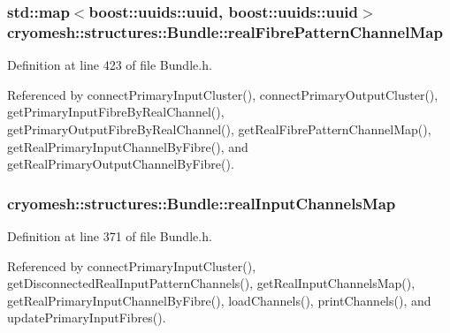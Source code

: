 \hypertarget{classcryomesh_1_1structures_1_1Bundle_adaf7fa91209de01b9d42ae2d8228c3cd}{
\subsubsection[{real\-Fibre\-Pattern\-Channel\-Map}]{\setlength{\rightskip}{0pt plus 5cm}std\-::map$<$boost\-::uuids\-::uuid, boost\-::uuids\-::uuid$>$ {\bf cryomesh\-::structures\-::\-Bundle\-::real\-Fibre\-Pattern\-Channel\-Map}}}\label{classcryomesh_1_1structures_1_1Bundle_adaf7fa91209de01b9d42ae2d8228c3cd}


\-Definition at line 423 of file \-Bundle.\-h.



\-Referenced by connect\-Primary\-Input\-Cluster(), connect\-Primary\-Output\-Cluster(), get\-Primary\-Input\-Fibre\-By\-Real\-Channel(), get\-Primary\-Output\-Fibre\-By\-Real\-Channel(), get\-Real\-Fibre\-Pattern\-Channel\-Map(), get\-Real\-Primary\-Input\-Channel\-By\-Fibre(), and get\-Real\-Primary\-Output\-Channel\-By\-Fibre().

\hypertarget{classcryomesh_1_1structures_1_1Bundle_ac9bd1c696001ef8acb7291a5f9e81c8b}{
\subsubsection[{real\-Input\-Channels\-Map}]{ {\bf cryomesh\-::structures\-::\-Bundle\-::real\-Input\-Channels\-Map}}}\label{classcryomesh_1_1structures_1_1Bundle_ac9bd1c696001ef8acb7291a5f9e81c8b}


\-Definition at line 371 of file \-Bundle.\-h.



\-Referenced by connect\-Primary\-Input\-Cluster(), get\-Disconnected\-Real\-Input\-Pattern\-Channels(), get\-Real\-Input\-Channels\-Map(), get\-Real\-Primary\-Input\-Channel\-By\-Fibre(), load\-Channels(), print\-Channels(), and update\-Primary\-Input\-Fibres().

